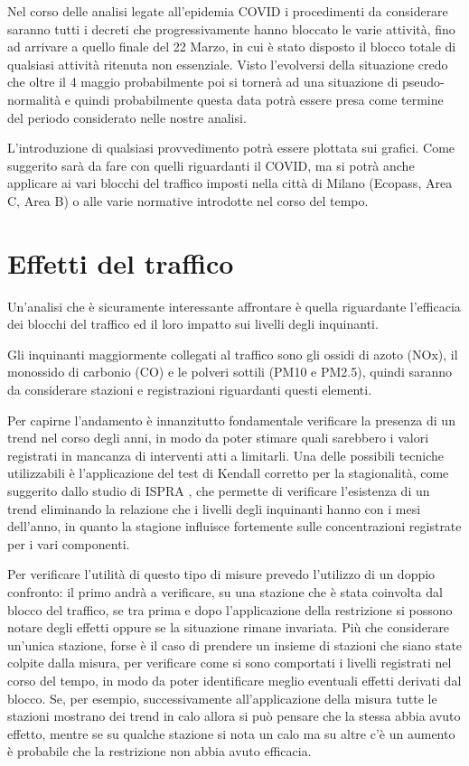 \documentclass{article}
\begin{document}
Nel corso delle analisi legate all'epidemia COVID i procedimenti da considerare saranno tutti i decreti che progressivamente hanno bloccato le varie attività, fino ad arrivare a quello finale del 22 Marzo, in cui è stato disposto il blocco totale di qualsiasi attività ritenuta non essenziale. Visto l'evolversi della situazione credo che oltre il 4 maggio probabilmente poi si tornerà ad una situazione di pseudo-normalità e quindi probabilmente questa data potrà essere presa come termine del periodo considerato nelle nostre analisi.

L'introduzione di qualsiasi provvedimento potrà essere plottata sui grafici. Come suggerito sarà da fare con quelli riguardanti il COVID, ma si potrà anche applicare ai vari blocchi del traffico imposti nella città di Milano (Ecopass, Area C, Area B) o alle varie normative introdotte nel corso del tempo.

\section{Effetti del traffico}
\label{sec:traffico}
Un'analisi che è sicuramente interessante affrontare è quella riguardante l'efficacia dei blocchi del traffico ed il loro impatto sui livelli degli inquinanti. 

Gli inquinanti maggiormente collegati al traffico sono gli ossidi di azoto (NOx), il monossido di carbonio (CO) e le polveri sottili (PM10 e PM2.5), quindi saranno da considerare stazioni e registrazioni riguardanti questi elementi.

Per capirne l'andamento è innanzitutto fondamentale verificare la presenza di un trend nel corso degli anni, in modo da poter stimare quali sarebbero i valori registrati in mancanza di interventi atti a limitarli. Una delle possibili tecniche utilizzabili è l'applicazione del test di Kendall corretto per la stagionalità, come suggerito dallo studio di ISPRA \cite{cattani2014analisi}, che permette di verificare l'esistenza di un trend eliminando la relazione che i livelli degli inquinanti hanno con i mesi dell'anno, in quanto la stagione influisce fortemente sulle concentrazioni registrate per i vari componenti.   

Per verificare l'utilità di questo tipo di misure prevedo l'utilizzo di un doppio confronto: il primo andrà a verificare, su una stazione che è stata coinvolta dal blocco del traffico, se tra prima e dopo l'applicazione della restrizione si possono notare degli effetti oppure se la situazione rimane invariata.
Più che considerare un'unica stazione, forse è il caso di prendere un insieme di stazioni che siano state colpite dalla misura, per verificare come si sono comportati i livelli registrati nel corso del tempo, in modo da poter identificare meglio eventuali effetti derivati dal blocco. Se, per esempio, successivamente all'applicazione della misura tutte le stazioni mostrano dei trend in calo allora si può pensare che la stessa abbia avuto effetto, mentre se su qualche stazione si nota un calo ma su altre c'è un aumento è probabile che la restrizione non abbia avuto efficacia.
\end{document}
